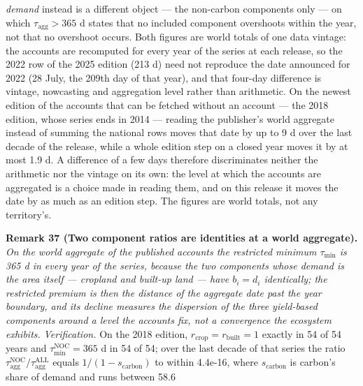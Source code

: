 \documentclass[11pt]{article}
\begin{document}
\emph{demand} instead is a different object --- the non-carbon components only --- on which
\(\tau_{\mathrm{agg}} > 365\) d states that no included component overshoots within the year, not that no
overshoot occurs. Both figures are world totals of one data vintage: the accounts are recomputed for every
year of the series at each release, so the 2022 row of the 2025 edition (213 d) need not reproduce the date
announced for 2022 (28 July, the 209th day of that year), and that four-day difference is vintage, nowcasting and aggregation level rather than arithmetic. On the newest edition of the accounts that can be fetched without an account --- the 2018 edition, whose series ends in 2014 --- reading the publisher's world aggregate instead of summing the national rows moves that date by up to 9 d over the last decade of the release, while a whole edition step on a closed year moves it by at most 1.9 d. A difference of a few days therefore discriminates
neither the arithmetic nor the vintage on its own: the level at which the accounts are aggregated is a choice made in
reading them, and on this release it moves the date by as much as an edition step. The figures are world totals, not any territory's.


\textbf{Remark 37 (Two component ratios are identities at a world aggregate).} \emph{On the world aggregate of the published accounts the restricted minimum \(\tau_{\min}\) is 365 d in every year of the series, because the two components whose demand is the area itself --- cropland and built-up land --- have \(b_i = d_i\) identically; the restricted premium is then the distance of the aggregate date past the year boundary, and its decline measures the dispersion of the three yield-based components around a level the accounts fix, not a convergence the ecosystem exhibits.} \emph{Verification.} On the 2018 edition, \(r_{\mathrm{crop}} = r_{\mathrm{built}} = 1\) exactly in 54 of 54 years and \(\tau_{\min}^{\mathrm{NOC}} = 365\) d in 54 of 54; over the last decade of that series the ratio \(\tau_{\mathrm{agg}}^{\mathrm{NOC}}/\tau_{\mathrm{agg}}^{\mathrm{ALL}}\) equals \(1/(1-s_{\mathrm{carbon}})\) to within 4.4e-16, where \(s_{\mathrm{carbon}}\) is carbon's share of demand and runs between 58.6%
\end{document}
